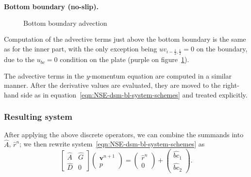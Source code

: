 \documentclass{article}
\begin{document}
\textbf{Bottom boundary (no-slip).}
\begin{figure}[H] %
  \caption{Bottom boundary advection}\label{fig:ADV-bottom}
\end{figure}
Computation of the advective terms just above the bottom boundary is the same as for the inner part, with the only exception being $uv_{i-\frac{1}{2},\frac{1}{2}}=0$ on the boundary, due to the $u_{bc}=0$ condition on the plate (purple on figure~\ref{fig:ADV-bottom}).

The advective terms in the $y$-momentum equation are computed in a similar manner. After the derivative values are evaluated, they are moved to the right-hand side as in equation~\eqref{eqn:NSE-dsm-bl-system-schemes} and treated explicitly. 

\subsubsection{Resulting system}\label{subsubsec:resulting-algorithm}
After applying the above discrete operators, we can combine the summands into $\hat{A}$, $\hat{r}^n$; we then rewrite system~\eqref{eqn:NSE-dsm-bl-system-schemes}  as
\begin{equation}
	\begin{bmatrix}
		\hat{A} & \hat{G} \\
		\hat{D} & 0
	\end{bmatrix}
	\begin{pmatrix}
		\boldsymbol{v}^{n+1} \\ 
		p
	\end{pmatrix}
	=
	\begin{pmatrix}
		\hat{r}^n \\
		0
	\end{pmatrix}
	+
	\begin{pmatrix}
		\hat{bc}_1\\
		\hat{bc}_2
	\end{pmatrix}.
\end{equation}
\end{document}
